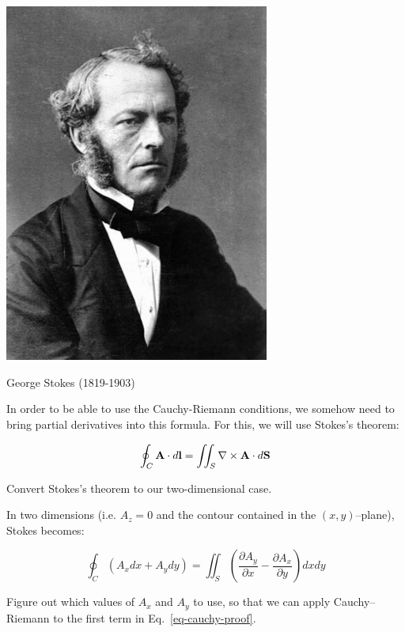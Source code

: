 \begin{marginfigure}[-3cm]
  \includegraphics{complex/figures/stokes}
  \caption{George Stokes (1819-1903)}
\end{marginfigure}

In order to be able to use the Cauchy-Riemann conditions, we somehow need to bring partial derivatives into this formula. For this, we will use Stokes's theorem:

\begin{equation}
\oint_{{{C}}} {\bf A} \cdot d {\bf l} = \iint_S \nabla \times {\bf A} \cdot d {\bf S}
\end{equation}

\begin{cue}
Convert Stokes's theorem to our two-dimensional case.
\end{cue}

In two dimensions (i.e. $A_z=0$ and the contour contained in the $(x,y)$--plane), Stokes becomes:

\begin{equation}
\oint_{{C}} \left(A_x dx + A_y dy\right) = \iint_S \left(\frac{\partial
A_y}{\partial x} - \frac{\partial A_x}{\partial y} \right)dx dy
\end{equation} 

\begin{cue}
Figure out which values of $A_x$ and $A_y$ to use, so that we can apply Cauchy--Riemann to the first term in Eq.~\ref{eq-cauchy-proof}.
\end{cue}

